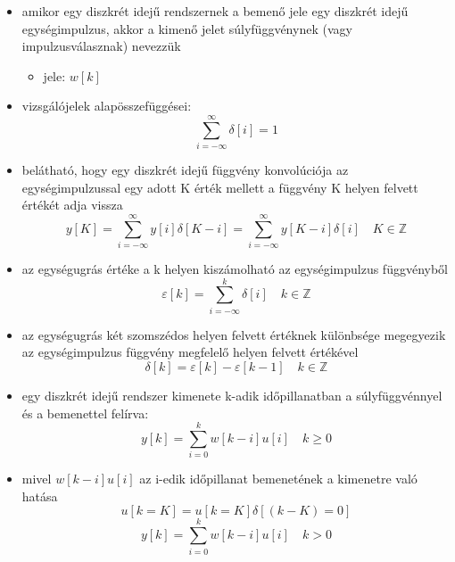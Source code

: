 \begin{itemize}
    \item amikor egy diszkrét idejű rendszernek a bemenő jele egy diszkrét idejű egységimpulzus, akkor a kimenő jelet súlyfüggvénynek (vagy impulzusválasznak) nevezzük
    \begin{itemize}
        \item jele: $w[k]$
    \end{itemize}
    \item vizsgálójelek alapösszefüggései:
    $$ \sum_{i=-\infty}^{\infty} \delta[i] = 1 $$
    \item belátható, hogy egy diszkrét idejű függvény konvolúciója az egységimpulzussal egy adott K érték mellett a függvény K helyen felvett értékét adja vissza
    $$ y[K] = \sum_{i=-\infty}^{\infty} y[i] \delta[K-i] = \sum_{i=-\infty}^{\infty} y[K-i] \delta[i] \quad K \in \mathbb{Z} $$
    \item az egységugrás értéke a k helyen kiszámolható az egységimpulzus függvényből
    $$ \varepsilon[k] = \sum_{i=-\infty}^{k} \delta[i] \quad k \in \mathbb{Z} $$
    \item az egységugrás két szomszédos helyen felvett értéknek különbsége megegyezik az egységimpulzus függvény megfelelő helyen felvett értékével
    $$ \delta[k] = \varepsilon[k] - \varepsilon[k-1] \quad k \in \mathbb{Z} $$
    \item egy diszkrét idejű rendszer kimenete k-adik időpillanatban a súlyfüggvénnyel és a bemenettel felírva:
    $$ y[k] = \sum_{i=0}^{k} w[k-i]u[i] \quad k \geq 0 $$
    \item mivel $w[k-i]u[i]$ az i-edik időpillanat bemenetének a kimenetre való hatása
    $$ u[k=K] = u[k=K]\delta[(k-K)=0] $$
    $$ y[k] = \sum_{i=0}^{k} w[k-i]u[i] \quad k > 0 $$
    
    \begin{figure}[H]
        \centering
\end{figure}
\end{itemize}
